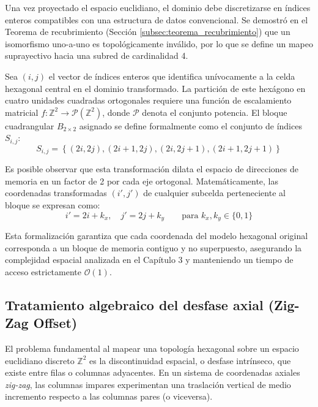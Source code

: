 Una vez proyectado el espacio euclidiano, el dominio debe discretizarse en índices enteros compatibles con una estructura de datos convencional. Se demostró en el Teorema de recubrimiento (Sección \ref{subsec:teorema_recubrimiento}) que un isomorfismo uno-a-uno es topológicamente inválido, por lo que se define un mapeo suprayectivo hacia una subred de cardinalidad 4.

Sea $(i, j)$ el vector de índices enteros que identifica unívocamente a la celda hexagonal central en el dominio transformado. La partición de este hexágono en cuatro unidades cuadradas ortogonales requiere una función de escalamiento matricial $f: \mathbb{Z}^2 \to \mathcal{P}(\mathbb{Z}^2)$, donde $\mathcal{P}$ denota el conjunto potencia. El bloque cuadrangular $B_{2\times 2}$ asignado se define formalmente como el conjunto de índices $S_{i,j}$:
\begin{equation}
    S_{i,j} = \left\{ (2i, 2j), (2i+1, 2j), (2i, 2j+1), (2i+1, 2j+1) \right\}
    \label{eq:mapeo_indices}
\end{equation}

Es posible observar que esta transformación dilata el espacio de direcciones de memoria en un factor de 2 por cada eje ortogonal. Matemáticamente, las coordenadas transformadas $(i', j')$ de cualquier subcelda perteneciente al bloque se expresan como:
\begin{equation}
    i' = 2i + k_x, \quad j' = 2j + k_y \qquad \text{para } k_x, k_y \in \{0, 1\}
\end{equation}

Esta formalización garantiza que cada coordenada del modelo hexagonal original corresponda a un bloque de memoria contiguo y no superpuesto, asegurando la complejidad espacial analizada en el Capítulo 3 y manteniendo un tiempo de acceso estrictamente $\mathcal{O}(1)$.

\subsection{Tratamiento algebraico del desfase axial (Zig-Zag Offset)}
\label{subsec:desfase_axial}

El problema fundamental al mapear una topología hexagonal sobre un espacio euclidiano discreto $\mathbb{Z}^2$ es la discontinuidad espacial, o desfase intrínseco, que existe entre filas o columnas adyacentes. En un sistema de coordenadas axiales \textit{zig-zag}, las columnas impares experimentan una traslación vertical de medio incremento respecto a las columnas pares (o viceversa). 

